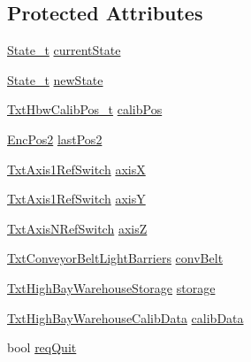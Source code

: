 \subsection*{Protected Attributes}
\begin{DoxyCompactItemize}
\item 
\hyperlink{classft_1_1_txt_high_bay_warehouse_aa35f35b5549913d838cb6070bb28da30}{State\+\_\+t} \hyperlink{classft_1_1_txt_high_bay_warehouse_a15a6bfc9bbc73841e4deb8e5957ed76c}{current\+State}
\item 
\hyperlink{classft_1_1_txt_high_bay_warehouse_aa35f35b5549913d838cb6070bb28da30}{State\+\_\+t} \hyperlink{classft_1_1_txt_high_bay_warehouse_a5c034252f7f1477ccb0acc21148c6d4c}{new\+State}
\item 
\hyperlink{namespaceft_a88bb8b41aa7e6a6d38447ae6f2caa4b5}{Txt\+Hbw\+Calib\+Pos\+\_\+t} \hyperlink{classft_1_1_txt_high_bay_warehouse_a4efec14e60a1c700524d0f37599df4a7}{calib\+Pos}
\item 
\hyperlink{classft_1_1_enc_pos2}{Enc\+Pos2} \hyperlink{classft_1_1_txt_high_bay_warehouse_adff0e6e55befd942c89e1ae10e5fb910}{last\+Pos2}
\item 
\hyperlink{classft_1_1_txt_axis1_ref_switch}{Txt\+Axis1\+Ref\+Switch} \hyperlink{classft_1_1_txt_high_bay_warehouse_a32aff14ae3169fe5f4b94268362ab757}{axisX}
\item 
\hyperlink{classft_1_1_txt_axis1_ref_switch}{Txt\+Axis1\+Ref\+Switch} \hyperlink{classft_1_1_txt_high_bay_warehouse_a5e65f43da4467849a5c45e0e8ec109c5}{axisY}
\item 
\hyperlink{classft_1_1_txt_axis_n_ref_switch}{Txt\+Axis\+N\+Ref\+Switch} \hyperlink{classft_1_1_txt_high_bay_warehouse_a8df26228e9b0a93fb4cd9301661841fc}{axisZ}
\item 
\hyperlink{classft_1_1_txt_conveyor_belt_light_barriers}{Txt\+Conveyor\+Belt\+Light\+Barriers} \hyperlink{classft_1_1_txt_high_bay_warehouse_a21a7a8b3f7f7bd8b8d9b375f956e043d}{conv\+Belt}
\item 
\hyperlink{classft_1_1_txt_high_bay_warehouse_storage}{Txt\+High\+Bay\+Warehouse\+Storage} \hyperlink{classft_1_1_txt_high_bay_warehouse_af7b1534ad416b0f0f86c2792e2982a4f}{storage}
\item 
\hyperlink{classft_1_1_txt_high_bay_warehouse_calib_data}{Txt\+High\+Bay\+Warehouse\+Calib\+Data} \hyperlink{classft_1_1_txt_high_bay_warehouse_a6f59992878b73195da5a64ba7cec19ac}{calib\+Data}
\item 
bool \hyperlink{classft_1_1_txt_high_bay_warehouse_abb655a59ffddd97aa2e009e328309a5c}{req\+Quit}

\end{DoxyCompactItemize}
